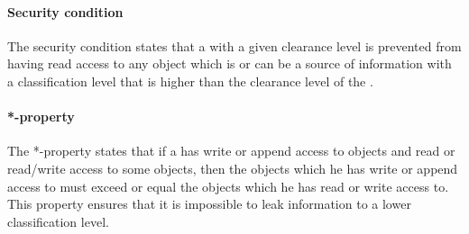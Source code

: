 \paragraph{Security condition}
The security condition states that a \principal{} with a given clearance level is prevented from having read access to any object which is or can be a source of information with a classification level that is higher than the clearance level of the \principal{}.

\paragraph{*-property}
The *-property states that if a \principal{} has write or append access to objects and read or read/write access to some objects, then the objects which he has write or append access to must exceed or equal the objects which he has read or write access to.
This property ensures that it is impossible to leak information to a lower classification level.


